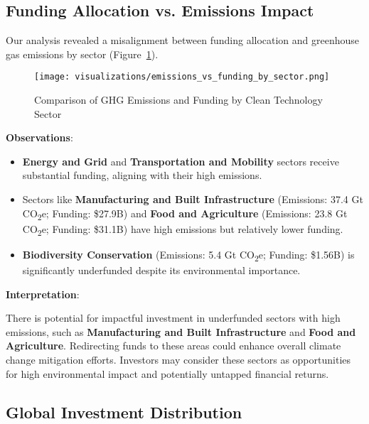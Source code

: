 \documentclass[sigconf]{acmart}
\begin{document}
\subsection{Funding Allocation vs. Emissions Impact}

Our analysis revealed a misalignment between funding allocation and greenhouse gas emissions by sector (Figure~\ref{fig:emissions_vs_funding}).

\begin{figure}[htpb]
    \centering
    \texttt{[image: visualizations/emissions\_vs\_funding\_by\_sector.png]}
    \caption{Comparison of GHG Emissions and Funding by Clean Technology Sector}
    \label{fig:emissions_vs_funding}
\end{figure}

\textbf{Observations}:

\begin{itemize}
    \item \textbf{Energy and Grid} and \textbf{Transportation and Mobility} sectors receive substantial funding, aligning with their high emissions.
    \item Sectors like \textbf{Manufacturing and Built Infrastructure} (Emissions: 37.4 Gt CO\textsubscript{2}e; Funding: \$27.9B) and \textbf{Food and Agriculture} (Emissions: 23.8 Gt CO\textsubscript{2}e; Funding: \$31.1B) have high emissions but relatively lower funding.
    \item \textbf{Biodiversity Conservation} (Emissions: 5.4 Gt CO\textsubscript{2}e; Funding: \$1.56B) is significantly underfunded despite its environmental importance.
\end{itemize}

\textbf{Interpretation}:

There is potential for impactful investment in underfunded sectors with high emissions, such as \textbf{Manufacturing and Built Infrastructure} and \textbf{Food and Agriculture}. Redirecting funds to these areas could enhance overall climate change mitigation efforts. Investors may consider these sectors as opportunities for high environmental impact and potentially untapped financial returns.

\subsection{Global Investment Distribution}
\end{document}
